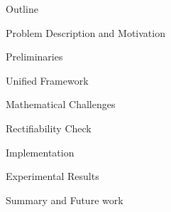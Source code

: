\begin{frame}{\large Outline}
\bi
	\item Problem Description and Motivation
	\item Preliminaries
	\item Unified Framework
	\bi
		\item Mathematical Challenges
	\ei
	\item Rectifiability Check
	\item Implementation
	\item Experimental Results
	\item Summary and Future work
\ei
\end{frame}


